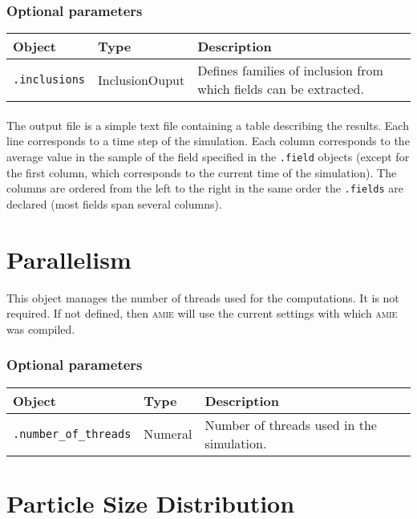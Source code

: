 \documentclass[10pt]{article}
\begin{document}
\subsubsection*{Optional parameters}

\begin{tabularx}{\textwidth}{llX}
\hline 
Object & Type & Description \\ 
\hline 
\verb+.inclusions+ & InclusionOuput & Defines families of inclusion from which fields can be extracted. \\ 
\hline 
\end{tabularx}

\paragraph{} The output file is a simple text file containing a table describing the results. Each line corresponds to a time step of the simulation. Each column corresponds to the average value in the sample of the field specified in the \verb+.field+ objects (except for the first column, which corresponds to the current time of the simulation). The columns are ordered from the left to the right in the same order the \verb+.fields+ are declared (most fields span several columns).

\section{Parallelism}

This object manages the number of threads used for the computations. It is not required. If not defined, then \textsc{amie} will use the current settings with which \textsc{amie} was compiled.

\subsubsection*{Optional parameters}

\begin{tabularx}{\textwidth}{llX}
\hline 
Object & Type & Description \\ 
\hline 
\verb+.number_of_threads+ & Numeral & Number of threads used in the simulation.\\ 
\hline 
\end{tabularx}

\section{Particle Size Distribution}
\end{document}
